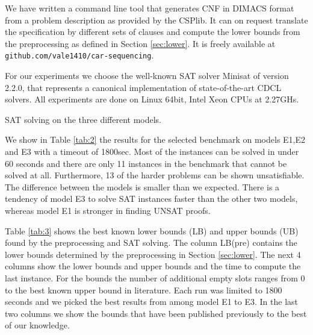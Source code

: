 \documentclass[]{llncs}
\begin{document}
We have written a command line tool that generates CNF in DIMACS format from a problem description as provided by the
CSPlib. It can on request translate the specification by different sets of clauses and compute the lower bounds from the
preprocessing as defined in Section \ref{sec:lower}. It is freely available at \verb+github.com/vale1410/car-sequencing+.

For our experiments we choose the well-known SAT solver Minisat \cite{Een03} of version 2.2.0, that represents a
canonical implementation of state-of-the-art CDCL solvers. All experiments are done on Linux 64bit, Intel Xeon CPUs at
2.27GHs.

\begin{table}[htbp]
    \caption{SAT solving on the three different models.}
    \centering
    \begin{minipage}[t]{0.5\textwidth}
    \begin{center}
    
    \end{center}
    \end{minipage}%
    \begin{minipage}[t]{0.5\textwidth}
    \begin{center}
    
    \end{center}
    \end{minipage}
    \label{tab:2}
\end{table}

We show in Table \ref{tab:2} the results for the selected benchmark on models E1,E2 and E3 with a timeout of 1800sec.
Most of the instances can be solved in under 60 seconds and there are only 11 instances in the benchmark that cannot be
solved at all. Furthermore, 13 of the harder problems can be shown unsatisfiable. The difference between the models is
smaller than we expected. There is a tendency of model E3 to solve SAT instances faster than the other two models,
whereas model E1 is stronger in finding UNSAT proofs. 

Table \ref{tab:3} shows the best known lower bounds (LB) and upper bounds (UB) found by the preprocessing and SAT
solving. The column LB(pre) contains the lower bounds determined by the preprocessing in Section \ref{sec:lower}. The
next 4 columns show the lower bounds and upper bounds and the time to compute the last instance. For the bounds the
number of additional empty slots ranges from 0 to the best known upper bound in literature. Each run was limited to 1800
seconds and we picked the best results from among model E1 to E3. In the last two columns we show the bounds that have
been published previously to the best of our knowledge. 
\end{document}
